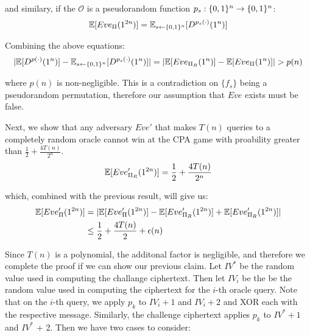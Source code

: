 \documentclass{article}
\begin{document}
\begin{enumerate}
\begin{enumerate}[,label=\alph*.]
and similary, if the $\mathcal{O}$ is a pseudorandom function $p_s: \{0,1\}^n \to \{0,1\}^n$:%
\noindent\noindent\[%
\E[Eve_{\Pi}(1^{2n})] = \E_{s \gets \zo^n}[D^{p_s(\cdot)}(1^n)]
\]%

Combining the above equations:%
\noindent\noindent\[%
|\E[D^{p(\cdot)}(1^n)] -  \E_{s \gets \zo^n}[D^{p_s(\cdot)}(1^n)] | = |\E[Eve_{\Pi_R}(1^n)] - \E[Eve_{\Pi}(1^n)] | > p(n)
\]%

where $p(n)$ is non-negligible. This is a contradiction on $\{f_s\}$ being a pseudorandom 
permutation, therefore our assumption that $Eve$ exists must be false.%

Next, we show that any adversary $Eve'$ that makes $T(n)$ queries to a completely random oracle
cannot win at the CPA game with proability greater than $\frac{1}{2} + \frac{4T(n)}{2^n}$.%
\noindent\noindent\[%
\E[Eve'_{\Pi_R}(1^{2n})] = \frac{1}{2} + \frac{4T(n)}{2^n}
\]%

which, combined with the previous result, will give us:%
\noindent\noindent\[%
\begin{aligned}
\E[Eve'_{\Pi}(1^{2n})] &= |\E[Eve'_{\Pi}(1^{2n})]  - \E[Eve'_{\Pi_R}(1^{2n})] + \E[Eve'_{\Pi_R}(1^{2n})]  | \\
&\leq \frac{1}{2} + \frac{4T(n)}{2} + \epsilon(n)
\end{aligned}
\]%

Since $T(n)$ is a polynomial, the additonal factor is negligible, and therefore we
complete the proof if we can show our previous claim. Let $IV^*$ be the random value used in
computing the challange ciphertext. Then let $IV_i$ be the be the random value used in 
computing the ciphertext for the $i$-th oracle query. Note that on the $i$-th query, we apply
$p_k$ to $IV_i + 1$ and $IV_i + 2$ and XOR each with the respective message. Similarly, the challenge
ciphertext applies $p_k$ to $IV^* + 1$ and $IV^*$ + 2. Then we have two cases to consider:%


\end{enumerate}
\end{enumerate}
\end{document}

